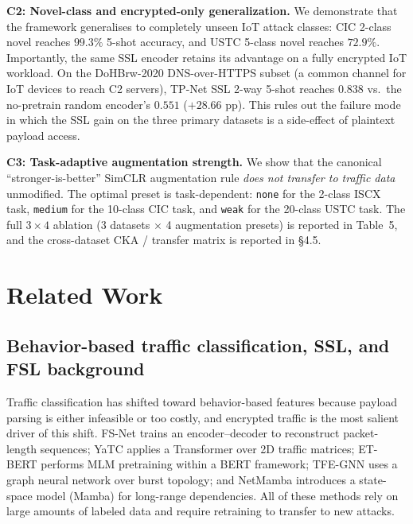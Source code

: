 \documentclass[sensors,article,submit,moreauthors]{Definitions/mdpi}
\begin{document}
\medskip

\noindent\textbf{C2: Novel-class and encrypted-only generalization.} We demonstrate that the framework generalises to completely unseen IoT attack classes: CIC 2-class novel reaches $99.3\%$ 5-shot accuracy, and USTC 5-class novel reaches $72.9\%$. Importantly, the same SSL encoder retains its advantage on a fully encrypted IoT workload. On the DoHBrw-2020 DNS-over-HTTPS subset (a common channel for IoT devices to reach C2 servers), TP-Net SSL 2-way 5-shot reaches $0.838$ vs.\ the no-pretrain random encoder's $0.551$ ($+28.66$ pp). This rules out the failure mode in which the SSL gain on the three primary datasets is a side-effect of plaintext payload access.

\medskip

\noindent\textbf{C3: Task-adaptive augmentation strength.} We show that the canonical ``stronger-is-better'' SimCLR augmentation rule \emph{does not transfer to traffic data} unmodified. The optimal preset is task-dependent: \texttt{none} for the 2-class ISCX task, \texttt{medium} for the 10-class CIC task, and \texttt{weak} for the 20-class USTC task. The full $3 \times 4$ ablation (3 datasets $\times$ 4 augmentation presets) is reported in Table~5, and the cross-dataset CKA / transfer matrix is reported in \S4.5.

\section{Related Work}

\subsection{Behavior-based traffic classification, SSL, and FSL background}
\label{sec:behavioral}

Traffic classification has shifted toward behavior-based features because payload parsing is either infeasible or too costly, and encrypted traffic is the most salient driver of this shift. FS-Net \cite{liu2019fsnet} trains an encoder--decoder to reconstruct packet-length sequences; YaTC \cite{zhao2023yatc} applies a Transformer over 2D traffic matrices; ET-BERT \cite{lin2022etbert} performs MLM pretraining within a BERT framework; TFE-GNN \cite{zhang2023tfegnn} uses a graph neural network over burst topology; and NetMamba \cite{wang2024netmamba} introduces a state-space model (Mamba) for long-range dependencies. All of these methods rely on large amounts of labeled data and require retraining to transfer to new attacks.
\end{document}
